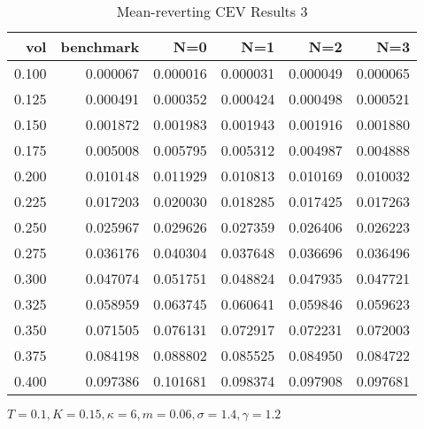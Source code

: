 \begin{table}[ht]
\centering
\caption{Mean-reverting CEV Results 3}
\begin{tabular}{rrrrrr}
\toprule
  vol &       benchmark &       N=0 &       N=1 &       N=2 &       N=3 \\
\midrule
0.100 & 0.000067 & 0.000016 & 0.000031 & 0.000049 & 0.000065 \\
0.125 & 0.000491 & 0.000352 & 0.000424 & 0.000498 & 0.000521 \\
0.150 & 0.001872 & 0.001983 & 0.001943 & 0.001916 & 0.001880 \\
0.175 & 0.005008 & 0.005795 & 0.005312 & 0.004987 & 0.004888 \\
0.200 & 0.010148 & 0.011929 & 0.010813 & 0.010169 & 0.010032 \\
0.225 & 0.017203 & 0.020030 & 0.018285 & 0.017425 & 0.017263 \\
0.250 & 0.025967 & 0.029626 & 0.027359 & 0.026406 & 0.026223 \\
0.275 & 0.036176 & 0.040304 & 0.037648 & 0.036696 & 0.036496 \\
0.300 & 0.047074 & 0.051751 & 0.048824 & 0.047935 & 0.047721 \\
0.325 & 0.058959 & 0.063745 & 0.060641 & 0.059846 & 0.059623 \\
0.350 & 0.071505 & 0.076131 & 0.072917 & 0.072231 & 0.072003 \\
0.375 & 0.084198 & 0.088802 & 0.085525 & 0.084950 & 0.084722 \\
0.400 & 0.097386 & 0.101681 & 0.098374 & 0.097908 & 0.097681 \\
\bottomrule
\end{tabular}
\small{$T=0.1,K=0.15, \kappa = 6,m=0.06, \sigma = 1.4, \gamma = 1.2$}
\end{table}

